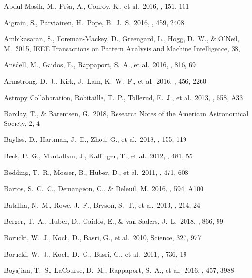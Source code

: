 \documentclass[modern]{aastex62}
\begin{document}
\begin{thebibliography}{}
 Abdul-Masih, M., Pr{\v s}a, A., Conroy, K., et al.\ 2016, \aj, 151, 101 

 Aigrain, S., Parviainen, H., Pope, B.~J.~S.\ 2016, \mnras, 459, 2408

 Ambikasaran, S., Foreman-Mackey, D., Greengard, L., Hogg, D.~W., \& O'Neil, M.\ 2015, IEEE Transactions on Pattern Analysis and Machine Intelligence, 38,  

 Ansdell, M., Gaidos, E., Rappaport, S.~A., et al.\ 2016, \apj, 816, 69 


 Armstrong, D.~J., Kirk, J., Lam, K.~W.~F., et al.\ 2016, \mnras, 456, 2260 

 Astropy Collaboration, Robitaille, T.~P., Tollerud, E.~J., et al.\ 2013, \aap, 558, A33 

 Barclay, T., \& Barentsen, G.\ 2018, Research Notes of the American Astronomical Society, 2, 4

 Bayliss, D., Hartman, J.~D., Zhou, G., et al.\ 2018, \aj, 155, 119 

 Beck, P.~G., Montalban, J., Kallinger, T., et al.\ 2012, \nat, 481, 55 

 Bedding, T.~R., Mosser, B., Huber, D., et al.\ 2011, \nat, 471, 608 

 Barros, S.~C.~C., Demangeon, O., \& Deleuil, M.\ 2016, \aap, 594, A100 

 Batalha, N.~M., Rowe, J.~F., Bryson, S.~T., et al.\ 2013, \apjs, 204, 24 

 Berger, T.~A., Huber, D., Gaidos, E., \& van Saders, J.~L.\ 2018, \apj, 866, 99 

 Borucki, W.~J., Koch, D., Basri, G., et al.\ 2010, Science, 327, 977 

 Borucki, W.~J., Koch, D.~G., Basri, G., et al.\ 2011, \apj, 736, 19 

 Boyajian, T.~S., LaCourse, D.~M., Rappaport, S.~A., et al.\ 2016, \mnras, 457, 3988 


\end{thebibliography}
\end{document}
